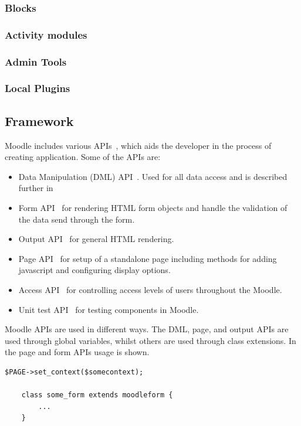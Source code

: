 	\subsubsection{Blocks}





	\subsubsection{Activity modules}





	\subsubsection{Admin Tools}






	\subsubsection{Local Plugins}




\subsection{Framework}
  Moodle includes various APIs~\cite{moodlecoreapis}, which aids the developer in the process of creating application. Some of the APIs are:
	
	\begin{itemize}
		\item Data Manipulation (DML) API~\cite{moodledml}. Used for all data access and is described further in 
		\item Form API~\cite{moodleformapi} for rendering HTML form objects and handle the validation of the data send through the form. 
		\item Output API~\cite{moodleoutputapi} for general HTML rendering.
		\item Page API~\cite{moodlepageapi} for setup of a standalone page including methods for adding javascript and configuring display options. 
		\item Access API~\cite{moodleaccessapi} for controlling access levels of users throughout the Moodle. 
		\item Unit test API~\cite{moodleunittestapi} for testing components in Moodle. 
	\end{itemize}
	Moodle APIs are used in different ways. The DML, page, and output APIs are used through global variables, whilst others are used through class extensions. In~ the page and form APIs usage is shown.
	\begin{lstlisting}[style=phpCode, caption=\myCaption{Example of the Page and form APIs in Moodle}, label=moodleapiusage]
	$PAGE->set_context($somecontext);
	
	class some_form extends moodleform {
		...
	}
	\end{lstlisting}

